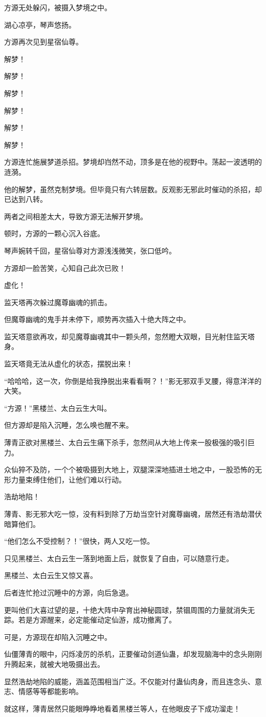 \begin{this_body}
方源无处躲闪，被摄入梦境之中。

湖心凉亭，琴声悠扬。

方源再次见到星宿仙尊。

解梦！

解梦！

解梦！

解梦！

解梦！

解梦！

方源连忙施展梦道杀招。梦境却岿然不动，顶多是在他的视野中。荡起一波透明的涟漪。

他的解梦，虽然克制梦境。但毕竟只有六转层数。反观影无邪此时催动的杀招，却已达到八转。

两者之间相差太大，导致方源无法解开梦境。

顿时，方源的一颗心沉入谷底。

琴声婉转千回，星宿仙尊对方源浅浅微笑，张口低吟。

方源却一脸苦笑，心知自己此次已败！

虚化！

监天塔再次躲过魔尊幽魂的抓击。

但魔尊幽魂的鬼手并未停下，顺势再次插入十绝大阵之中。

监天塔意欲再攻，却见魔尊幽魂其中一颗头颅，忽然瞪大双眼，目光射住监天塔身。

监天塔竟无法从虚化的状态，摆脱出来！

“哈哈哈，这一次，你倒是给我挣脱出来看看啊？！”影无邪双手叉腰，得意洋洋的大笑。

“方源！”黑楼兰、太白云生大叫。

但方源却是陷入沉睡，怎么唤也醒不来。

薄青正欲对黑楼兰、太白云生痛下杀手，忽然间从大地上传来一股极强的吸引巨力。

众仙猝不及防，一个个被吸摄到大地上，双腿深深地插进土地之中，一股恐怖的无形力量束缚住他们，让他们难以行动。

浩劫地陷！

薄青、影无邪大吃一惊，没有料到除了万劫当空针对魔尊幽魂，居然还有浩劫潜伏暗算他们。

“他们怎么不受控制？！”很快，两人又吃一惊。

只见黑楼兰、太白云生一落到地面上后，就恢复了自由，可以随意行走。

黑楼兰、太白云生又惊又喜。

后者连忙抢过沉睡中的方源，向后急退。

更叫他们大喜过望的是，十绝大阵中孕育出神秘圆球，禁锢周围的力量就消失无踪。若是方源醒来，必定能催动定仙游，成功撤离了。

可是，方源现在却陷入沉睡之中。

仙僵薄青的眼中，闪烁凌厉的杀机，正要催动剑道仙蛊，却发现脑海中的念头刚刚升腾起来，就被大地吸摄出去。

显然浩劫地陷的威能，涵盖范围相当广泛。不仅能对付蛊仙肉身，而且连念头、意志、情感等等都能影响。

就这样，薄青居然只能眼睁睁地看着黑楼兰等人，在他眼皮子下成功溜走！

\end{this_body}

